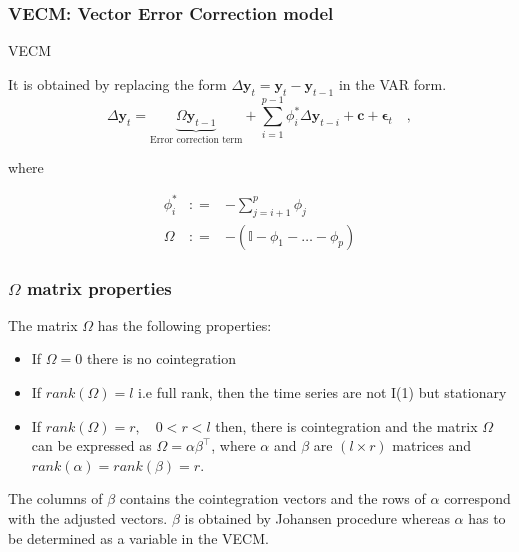 \documentclass[xcolor=dvipsnames]{beamer}
\begin{document}
\begin{frame}
\frametitle{VECM: Vector Error Correction model}
\begin{block}{VECM}

It is obtained by replacing the form {\color{red} $\Delta
\mathbf{y}_t = \mathbf{y}_t - \mathbf{y}_{t-1}$} in the VAR form.
{\color{blue}
\begin{equation}
 \label{eq:vec}
 \Delta \mathbf{y}_t = 
 \underbrace{ \Omega\mathbf{y}_{t-1}}_\text{Error correction term} + 
 \sum_{i=1}^{p-1}
\phi_i^* \Delta \mathbf{y}_{t-i}  + \mathbf{c} + \mathbf{\epsilon}_t \quad ,
\end{equation}}
\end{block}

\noindent where 

\begin{eqnarray*}
\phi_i^* &: =& -\sum_{j=i+1}^{p} \phi_j \\
\Omega &: =& -(\mathbb{I}-\phi_1-\dots-\phi_p) 
\end{eqnarray*}
\end{frame}

\begin{frame}
\frametitle{$\Omega$ matrix properties}
The matrix $\Omega$ has the following properties:
\begin{itemize}
\item If $\Omega = 0$ there is no cointegration
\item If $rank(\Omega)=l$ i.e full rank, then the time series are not
I(1) but stationary
\item If $rank(\Omega)=r,\quad 0 < r < l$ then, there is cointegration
and the matrix $\Omega$ can be expressed as $\Omega =
\alpha \beta^\top$, where $\alpha$ and $\beta$ are $(l \times r)$
matrices and $rank(\alpha)=rank(\beta)=r$.
\end{itemize}
The columns of $\beta$ contains the cointegration vectors and the rows of
$\alpha$ correspond with the adjusted vectors. $\beta$ is obtained by Johansen
procedure whereas $\alpha$ has to be determined as a
variable in the VECM.
\end{frame}
\end{document}
